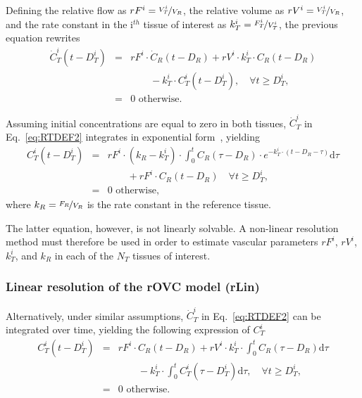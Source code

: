 Defining the relative flow as $rF^i = \nicefrac{V_T^i}{V_R}$, the relative volume as $rV^i = \nicefrac{V_T^i}{V_R}$, and the rate constant in the i$^{th}$ tissue of interest as $k_T^i = \nicefrac{F_T^i}{V_T^i}$, the previous equation rewrites
\begin{equation}
\begin{array}{rcl}
\dot{C}_T^i \left(t - D_T^i\right) &= & rF^i \cdot \dot{C}_{R}\left(t-D_R\right) + rV^i \cdot k_T^i \cdot C_{R} \left(t - D_{R}\right) \\
& & \qquad - k_T^i \cdot C_{T}^i \left( t - D_{T}^i \right), \quad \forall t \geq D_T^i,\\
&=& \textrm{0 otherwise.}
\end{array}
\label{eq:RTDEF2}
\end{equation}

Assuming initial concentrations are equal to zero in both tissues, $\dot{C}_T^i$ in Eq.~\ref{eq:RTDEF2} integrates in exponential form~\cite{Yankeelov2005}, yielding
\begin{equation}
\begin{array}{rcl}
C_T^i \left( t - D_T^i \right) & = & rF^i \cdot \left( k_R - k_T^i \right) \cdot \int_{0}^{t} C_{R} \left( \tau - D_R \right) \cdot e^{- k_T^i \cdot \left( t - D_R - \tau \right)} \mathrm d \tau \\
& & \qquad + rF^i \cdot C_{R} \left( t - D_R \right) \quad \forall t \geq D_T^i, \\
&=& \textrm{0 otherwise,}
\end{array}
\label{eq:RTDEF4}
\end{equation}
where $k_R = \nicefrac{F_R}{V_R}$ is the rate constant in the reference tissue.

The latter equation, however, is not linearly solvable. 
A non-linear resolution method must therefore be used in order to estimate vascular parameters $rF^i$, $rV^i$, $k_T^i$, and $k_R$ in each of the $N_T$ tissues of interest.

\subsubsection{Linear resolution of the rOVC model (rLin)}
Alternatively, under similar assumptions, $\dot{C}_T^i$ in Eq.~\ref{eq:RTDEF2} can be integrated over time, yielding the following expression of $C_T^i$~\cite{Cardenas2013}
\begin{equation}
\begin{array}{rcl}
C_T^i \left(t - D_T^i\right) &=& rF^i \cdot C_{R}\left(t-D_R\right) + rV^i \cdot k_T^i \cdot \int_0^t C_{R} \left(\tau - D_{R}\right) \mathrm d\tau \\
& & \qquad - k_T^i \cdot \int_0^t C_{T}^i \left( \tau - D_{T}^i \right) \mathrm d\tau, \quad \forall t \geq D_T^i,\\
&=& \textrm{0 otherwise.}
\end{array}
\label{eq:RTDEF3}
\end{equation}


